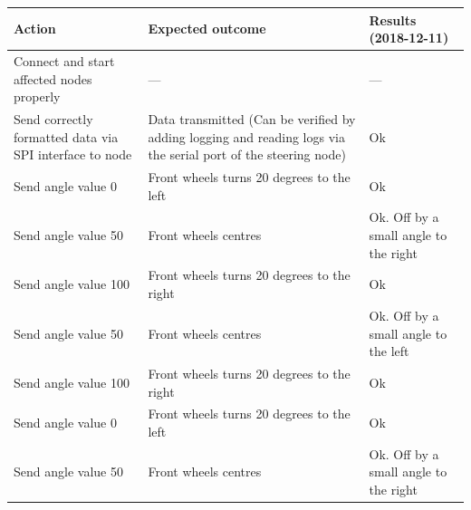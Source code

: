 \documentclass[11pt, titlepage]{article} %
\begin{document}
\begin{table}[H]
 \label{tab:title}
\centering
\begin{tabular}{|m{5cm}|m{5cm}|m{5cm}|}
\hline
Action & Expected outcome & Results (2018-12-11) \\ \hline
Connect and start affected nodes properly  &   ---    & ---  \\ \hline
Send correctly formatted data via SPI interface to node  &  Data transmitted (Can be verified by adding logging and reading logs via the serial port of the steering node)      & Ok  \\ \hline
Send angle value 0  & Front wheels turns 20 degrees to the left      & Ok  \\ \hline
Send angle value 50  & Front wheels centres      & Ok. Off by a small angle to the right  \\ \hline
Send angle value 100  & Front wheels turns 20 degrees to the right      & Ok  \\ \hline
Send angle value 50	  & Front wheels centres      & Ok. Off by a small angle to the left  \\ \hline
Send angle value 100	  & Front wheels turns 20 degrees to the right     & Ok  \\ \hline
Send angle value 0	  & Front wheels turns 20 degrees to the left      & Ok  \\ \hline
Send angle value 50	  & Front wheels centres      & Ok. Off by a small angle to the right  \\ \hline

\end{tabular}
\end{table}
\end{document}
